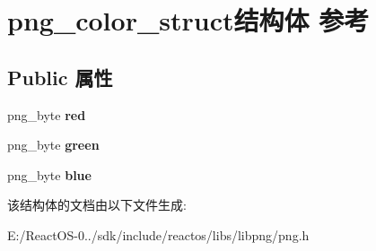 \hypertarget{structpng__color__struct}{}\section{png\+\_\+color\+\_\+struct结构体 参考}
\label{structpng__color__struct}
\subsection*{Public 属性}
\begin{DoxyCompactItemize}
\item 
\mbox{\label{structpng__color__struct_ad39dc2d7cb82e3670a3ad397bb4083cb}} 
png\+\_\+byte {\bfseries red}
\item 
\mbox{\label{structpng__color__struct_ada9b5a911b185eaf7c6b87934e9f11ce}} 
png\+\_\+byte {\bfseries green}
\item 
\mbox{\label{structpng__color__struct_a528e625b2778e787dc182e5df1164bbc}} 
png\+\_\+byte {\bfseries blue}
\end{DoxyCompactItemize}


该结构体的文档由以下文件生成\+:\begin{DoxyCompactItemize}
\item 
E\+:/\+React\+O\+S-\/0../sdk/include/reactos/libs/libpng/png.\+h\end{DoxyCompactItemize}
